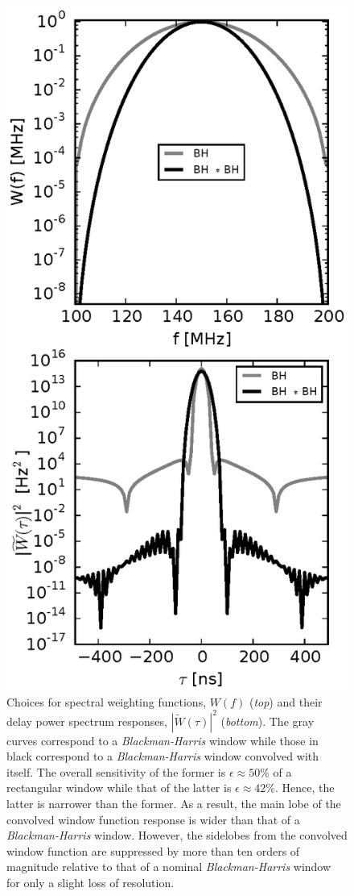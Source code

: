 \documentclass[preprint2,iop,numberedappendix,twocolappendix,appendixfloats]{emulateapj}
\begin{document}
\begin{figure}[htb]
  \centering
  \includegraphics[width=\linewidth]{window_function_modifications.eps}
  \caption{Choices for spectral weighting functions, $W(f)$ ({\it top}) and their delay power spectrum responses, $|\widetilde{W}(\tau)|^2$ ({\it bottom}). The gray curves correspond to a {\it Blackman-Harris} window while those in black correspond to a {\it Blackman-Harris} window convolved with itself. The overall sensitivity of the former is $\epsilon \approx 50\%$ of a rectangular window while that of the latter is $\epsilon \approx 42\%$. Hence, the latter is narrower than the former. As a result, the main lobe of the convolved window function response is wider than that of a {\it Blackman-Harris} window. However, the sidelobes from the convolved window function are suppressed by more than ten orders of magnitude relative to that of a nominal {\it Blackman-Harris} window for only a slight loss of resolution.}

\end{figure}
\end{document}
